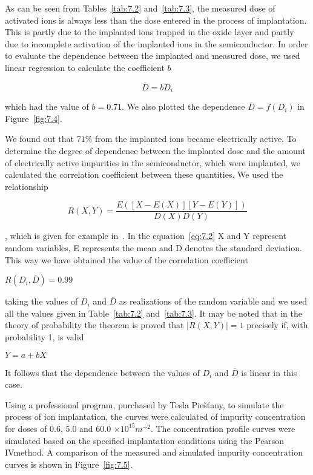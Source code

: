As can be seen from Tables~\ref{tab:7.2} and~\ref{tab:7.3}, the
measured dose of activated ions is always less than the dose entered
in the process of implantation. This is partly due to the implanted
ions trapped in the oxide layer and partly due to incomplete
activation of the implanted ions in the semiconductor. In order to
evaluate the dependence between the implanted and measured dose, we
used linear regression to calculate the coefficient $b$

\begin{equation}\label{eq:7.1}
  \overline D = bD_{i}
\end{equation}

which had the value of $b = 0.71$. We also plotted the dependence
$\overline D = f(D_{i})$ in Figure~\ref{fig:7.4}.

We found out that $71\%$ from the implanted ions became electrically
active. To determine the degree of dependence between the implanted
dose and the amount of electrically active impurities in the
semiconductor, which were implanted, we calculated the correlation
coefficient between these quantities. We used the relationship

\begin{equation}\label{eq:7.2}
  R(X,Y) = \frac{E([X-E(X)][Y-E(Y)])}{D(X)D(Y)}
\end{equation}

, which is given for example in~\cite{7.1}. In the
equation~\ref{eq:7.2} X and Y represent random variables, E represents
the mean and D denotes the standard deviation. This way we have
obtained the value of the correlation coefficient

\centerline{$R(D_{i}, \overline{D}) = 0.99$}

taking the values of $D_{i}$ and $\overline{D}$ as realizations of the
random variable and we used all the values given in
Table~\ref{tab:7.2} and~\ref{tab:7.3}. It may be noted that in the
theory of probability the theorem is proved that $\rvert R(X,Y)\rvert
= 1$ precisely if, with probability 1, is valid

\centerline{$Y = a + b X$}

It follows that the dependence between the values of $D_{i}$ and
$\overline D$ is linear in this case.

Using a professional program, purchased by Tesla Piešťany, to
simulate the process of ion implantation, the curves were
calculated of impurity concentration for doses of 0.6, 5.0 and 60.0
$\times10^{15}m^{-2}$.  The concentration profile curves were
simulated based on the specified implantation conditions using the
Pearson IV\@ method.  A comparison of the measured and simulated
impurity concentration curves is shown in Figure~\ref{fig:7.5}.

